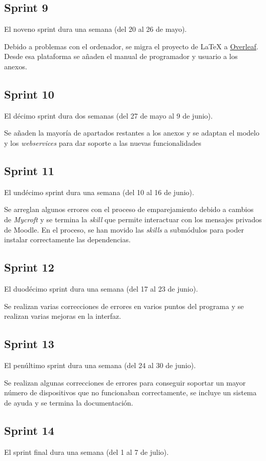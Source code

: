 \subsection{Sprint 9}
El noveno sprint dura una semana (del 20 al 26 de mayo).

Debido a problemas con el ordenador, se migra el proyecto de LaTeX a \href{https://overleaf.com}{Overleaf}. Desde esa plataforma se añaden el manual de programador y usuario a los anexos.
\subsection{Sprint 10}
El décimo sprint dura dos semanas (del 27 de mayo al 9 de junio).

Se añaden la mayoría de apartados restantes a los anexos y se adaptan el modelo y los \textit{webservices} para dar soporte a las nuevas funcionalidades
\subsection{Sprint 11}
El undécimo sprint dura una semana (del 10 al 16 de junio).

Se arreglan algunos errores con el proceso de emparejamiento debido a cambios de \textit{Mycroft} y se termina la \textit{skill} que permite interactuar con los mensajes privados de Moodle. En el proceso, se han movido las \textit{skills} a submódulos para poder instalar correctamente las dependencias.
\subsection{Sprint 12}
El duodécimo sprint dura una semana (del 17 al 23 de junio).

Se realizan varias correcciones de errores en varios puntos del programa y se realizan varias mejoras en la interfaz.
\subsection{Sprint 13}
El penúltimo sprint dura una semana (del 24 al 30 de junio).

Se realizan algunas correcciones de errores para conseguir soportar un mayor número de dispositivos que no funcionaban correctamente, se incluye un sistema de ayuda y se termina la documentación.
\subsection{Sprint 14}
El sprint final dura una semana (del 1 al 7 de julio).

